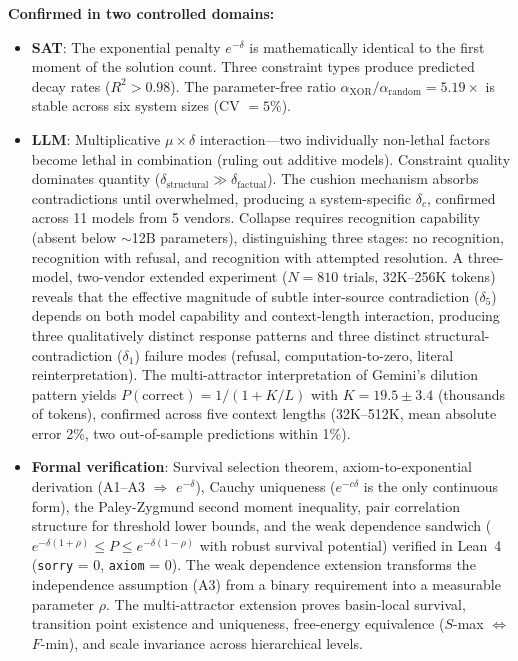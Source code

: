 \documentclass[11pt,a4paper]{article}
\begin{document}
\textbf{Confirmed in two controlled domains:}
\begin{itemize}
    \item \textbf{SAT}: The exponential penalty $e^{-\delta}$ is mathematically identical to the first moment of the solution count. Three constraint types produce predicted decay rates ($R^2 > 0.98$). The parameter-free ratio $\alpha_{\text{XOR}}/\alpha_{\text{random}} = 5.19\times$ is stable across six system sizes (CV $= 5\%$).
    \item \textbf{LLM}: Multiplicative $\mu \times \delta$ interaction---two individually non-lethal factors become lethal in combination (ruling out additive models). Constraint quality dominates quantity ($\delta_{\text{structural}} \gg \delta_{\text{factual}}$). The cushion mechanism absorbs contradictions until overwhelmed, producing a system-specific $\delta_c$, confirmed across 11 models from 5 vendors. Collapse requires recognition capability (absent below $\sim$12B parameters), distinguishing three stages: no recognition, recognition with refusal, and recognition with attempted resolution. A three-model, two-vendor extended experiment ($N = 810$ trials, 32K--256K tokens) reveals that the effective magnitude of subtle inter-source contradiction ($\delta_5$) depends on both model capability and context-length interaction, producing three qualitatively distinct response patterns and three distinct structural-contradiction ($\delta_1$) failure modes (refusal, computation-to-zero, literal reinterpretation). The multi-attractor interpretation of Gemini's dilution pattern yields $P(\text{correct}) = 1/(1 + K/L)$ with $K = 19.5 \pm 3.4$ (thousands of tokens), confirmed across five context lengths (32K--512K, mean absolute error 2\%, two out-of-sample predictions within 1\%).
    \item \textbf{Formal verification}: Survival selection theorem, axiom-to-exponential derivation (A1--A3 $\Rightarrow$ $e^{-\delta}$), Cauchy uniqueness ($e^{-c\delta}$ is the only continuous form), the Paley-Zygmund second moment inequality, pair correlation structure for threshold lower bounds, and the weak dependence sandwich ($e^{-\delta(1+\rho)} \leq P \leq e^{-\delta(1-\rho)}$ with robust survival potential) verified in Lean~4 (\texttt{sorry} = 0, \texttt{axiom} = 0). The weak dependence extension transforms the independence assumption (A3) from a binary requirement into a measurable parameter $\rho$. The multi-attractor extension proves basin-local survival, transition point existence and uniqueness, free-energy equivalence ($S$-max $\Leftrightarrow$ $F$-min), and scale invariance across hierarchical levels.
\end{itemize}
\end{document}
